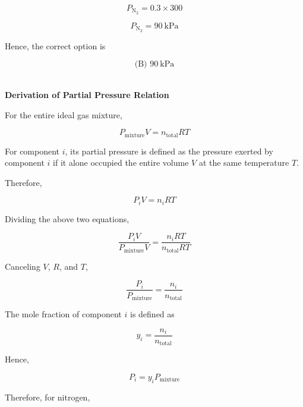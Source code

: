 \documentclass[12pt]{article}
\begin{document}
\begin{equation*}
P_{\mathrm{N_2}} = 0.3 \times 300
\end{equation*}

\begin{equation*}
\boxed{P_{\mathrm{N_2}} = 90\ \mathrm{kPa}}
\end{equation*}

Hence, the correct option is

\begin{equation*}
\boxed{\text{(B) }90\ \mathrm{kPa}}
\end{equation*}

\newpage
\textbf{\\ Derivation of Partial Pressure Relation}

For the entire ideal gas mixture,

\begin{equation*}
P_{\mathrm{mixture}}V=n_{\mathrm{total}}RT
\end{equation*}

For component $i$, its partial pressure is defined as the pressure exerted by component $i$ if it alone occupied the entire volume $V$ at the same temperature $T$.

Therefore,

\begin{equation*}
P_iV=n_iRT
\end{equation*}

Dividing the above two equations,

\begin{equation*}
\frac{P_iV}{P_{\mathrm{mixture}}V}
=
\frac{n_iRT}{n_{\mathrm{total}}RT}
\end{equation*}

Canceling $V$, $R$, and $T$,

\begin{equation*}
\frac{P_i}{P_{\mathrm{mixture}}}
=
\frac{n_i}{n_{\mathrm{total}}}
\end{equation*}

The mole fraction of component $i$ is defined as

\begin{equation*}
y_i=\frac{n_i}{n_{\mathrm{total}}}
\end{equation*}

Hence,

\begin{equation*}
\boxed{P_i=y_iP_{\mathrm{mixture}}}
\end{equation*}

Therefore, for nitrogen,
\end{document}
